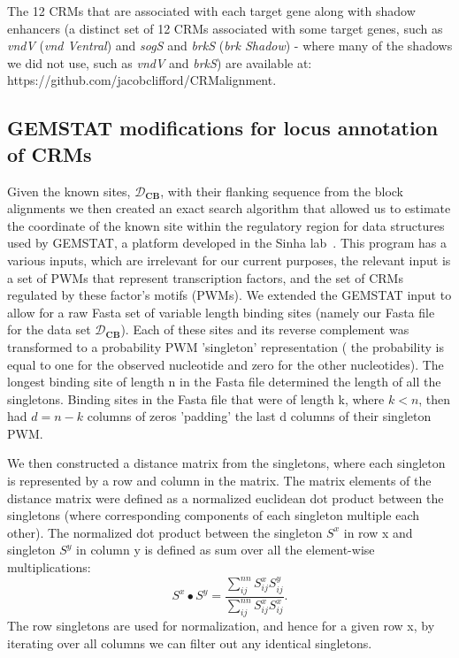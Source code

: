 The 12 CRMs that are associated with each target gene along with shadow enhancers (a distinct set of 12 CRMs associated with some target genes, such as \textit{vndV} (\textit{vnd Ventral}) and \textit{sogS} and \textit{brkS} (\textit{brk Shadow}) - where many of the shadows we did not use, such as \textit{vndV} and \textit{brkS}) are available at:  https://github.com/jacobclifford/CRMalignment.   


\subsection{GEMSTAT modifications for locus annotation of CRMs}\label{knownloc}
	 Given the known sites, $\mathcal D_{\textbf{CB}}$, with their flanking sequence from the block alignments we then created an exact search algorithm that allowed us to estimate the coordinate of the known site within the regulatory region for data structures used by GEMSTAT, a platform developed in the Sinha lab~\cite{pmid20862354}.  This program has a various inputs, which are irrelevant for our current purposes, the relevant input is a set of PWMs that represent transcription factors, and the set of CRMs regulated by these factor's motifs (PWMs).  We extended the GEMSTAT input to allow for a raw Fasta set of variable length binding sites (namely our Fasta file for the data set $\mathcal D_{\textbf{CB}}$).  Each of these sites and its reverse complement was transformed to a probability PWM 'singleton' representation ( the probability is equal to one for the observed nucleotide and zero for the other nucleotides).  The longest binding site of length n in the Fasta file determined the length of all the singletons.  Binding sites in the Fasta file that were of length k, where $k < n$, then had $d=n-k$ columns of zeros 'padding' the last d columns of their singleton PWM.
	 
	 We then constructed a distance matrix from the singletons, where each singleton is represented by a row and column in the matrix.   The matrix elements of the distance matrix were defined as a normalized euclidean dot product between the singletons (where corresponding components of each singleton multiple each other).  The normalized dot product between the singleton $S^x$ in row x and singleton $S^y$ in column y is defined as sum over all the element-wise multiplications:
\begin{equation}
	S^x \bullet S^y   = \frac{\sum_{ij}^{nn} S_{ij}^xS_{ij}^y}{\sum_{ij}^{nn}S_{ij}^xS_{ij}^x}.
	 \end{equation}	 
	 The row singletons are used for normalization, and hence for a given row x, by iterating over all columns we can filter out any identical singletons.
	 
